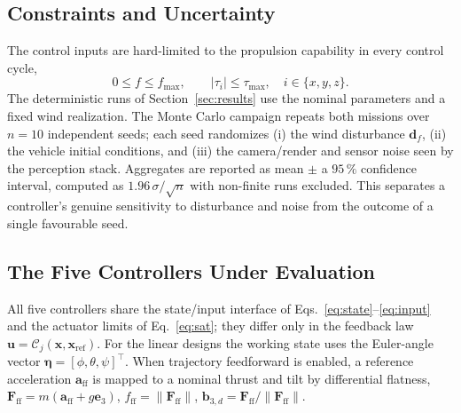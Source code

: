 \documentclass[12pt,a4paper]{article}
\begin{document}
\subsection{Constraints and Uncertainty}
The control inputs are hard-limited to the propulsion capability in every control cycle,
\begin{equation}
    0 \le f \le f_{\max}, \qquad |\tau_i| \le \tau_{\max}, \quad i\in\{x,y,z\}. \label{eq:sat}
\end{equation}
The deterministic runs of Section~\ref{sec:results} use the nominal parameters and a
fixed wind realization. The Monte Carlo campaign repeats both missions over $n=10$
independent seeds; each seed randomizes (i) the wind disturbance $\mathbf{d}_f$, (ii) the
vehicle initial conditions, and (iii) the camera/render and sensor noise seen by the
perception stack. Aggregates are reported as mean $\pm$ a $95\,\%$ confidence interval,
computed as $1.96\,\sigma/\sqrt{n}$ with non-finite runs excluded. This separates a
controller's genuine sensitivity to disturbance and noise from the outcome of a single
favourable seed.

\subsection{The Five Controllers Under Evaluation}\label{sec:controllers}
All five controllers share the state/input interface of
Eqs.~\eqref{eq:state}--\eqref{eq:input} and the actuator limits of Eq.~\eqref{eq:sat};
they differ only in the feedback law $\mathbf{u}=\mathcal{C}_j(\mathbf{x},\mathbf{x}_{\mathrm{ref}})$.
For the linear designs the working state uses the Euler-angle vector
$\bm{\eta}=[\phi,\theta,\psi]^{\top}$. When trajectory feedforward is enabled, a reference
acceleration $\mathbf{a}_{\mathrm{ff}}$ is mapped to a nominal thrust and tilt by
differential flatness, $\mathbf{F}_{\mathrm{ff}} = m(\mathbf{a}_{\mathrm{ff}} + g\mathbf{e}_3)$,
$f_{\mathrm{ff}} = \lVert\mathbf{F}_{\mathrm{ff}}\rVert$,
$\mathbf{b}_{3,d} = \mathbf{F}_{\mathrm{ff}}/\lVert\mathbf{F}_{\mathrm{ff}}\rVert$.
\end{document}
